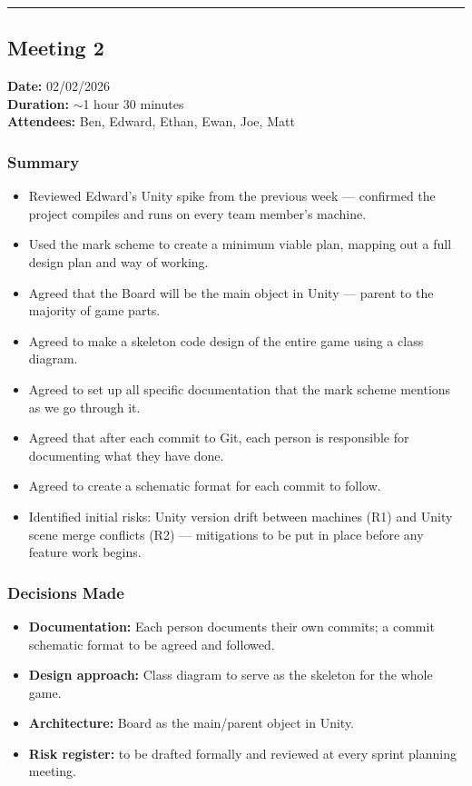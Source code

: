 \smallskip
\hrule
\smallskip

\subsection{Meeting 2}
\textbf{Date:} 02/02/2026 \\
\textbf{Duration:} $\sim$1 hour 30 minutes \\
\textbf{Attendees:} Ben, Edward, Ethan, Ewan, Joe, Matt

\subsubsection*{Summary}
\begin{itemize}
    \item Reviewed Edward's Unity spike from the previous week --- confirmed the project compiles and runs on every team member's machine.
    \item Used the mark scheme to create a minimum viable plan, mapping out a full design plan and way of working.
    \item Agreed that the Board will be the main object in Unity --- parent to the majority of game parts.
    \item Agreed to make a skeleton code design of the entire game using a class diagram.
    \item Agreed to set up all specific documentation that the mark scheme mentions as we go through it.
    \item Agreed that after each commit to Git, each person is responsible for documenting what they have done.
    \item Agreed to create a schematic format for each commit to follow.
    \item Identified initial risks: Unity version drift between machines (R1) and Unity scene merge conflicts (R2) --- mitigations to be put in place before any feature work begins.
\end{itemize}

\subsubsection*{Decisions Made}
\begin{itemize}
    \item \textbf{Documentation:} Each person documents their own commits; a commit schematic format to be agreed and followed.
    \item \textbf{Design approach:} Class diagram to serve as the skeleton for the whole game.
    \item \textbf{Architecture:} Board as the main/parent object in Unity.
    \item \textbf{Risk register:} to be drafted formally and reviewed at every sprint planning meeting.
\end{itemize}

